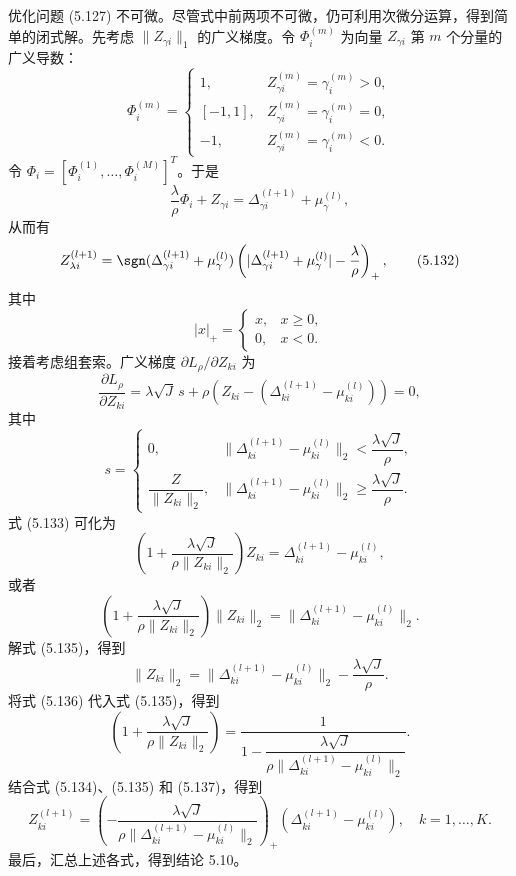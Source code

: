 优化问题 (5.127) 不可微。尽管式中前两项不可微，仍可利用次微分运算，得到简单的闭式解。先考虑 $\lVert Z_{\gamma i}\rVert_1$ 的广义梯度。令 $\Phi_i^{(m)}$ 为向量 $Z_{\gamma i}$ 第 $m$ 个分量的广义导数：
\[
\Phi_i^{(m)}=\begin{cases}
1,&Z_{\gamma i}^{(m)}=\gamma_i^{(m)}>0,\\
[-1,1],&Z_{\gamma i}^{(m)}=\gamma_i^{(m)}=0,\\
-1,&Z_{\gamma i}^{(m)}=\gamma_i^{(m)}<0.
\end{cases}
\]
令 $\Phi_i=[\Phi_i^{(1)},\ldots,\Phi_i^{(M)}]^T$。于是
\[
\frac\lambda\rho\Phi_i+Z_{\gamma i}=\Delta_{\gamma i}^{(l+1)}+\mu_\gamma^{(l)},
\]
从而有
\begin{equation}
Z_{\lambda i}^{(l+1)}=\sgn(\Delta_{\gamma i}^{(l+1)}+\mu_\gamma^{(l)})
\left(|\Delta_{\gamma i}^{(l+1)}+\mu_\gamma^{(l)}|-\frac\lambda\rho\right)_+,
\tag{5.132}
\end{equation}
其中
\[
|x|_+=\begin{cases}x,&x\geq0,\\0,&x<0.\end{cases}
\]
接着考虑组套索。广义梯度 $\partial L_\rho/\partial Z_{ki}$ 为
\begin{equation}
\frac{\partial L_\rho}{\partial Z_{ki}}
=\lambda\sqrt J\,s+\rho\left(Z_{ki}-(\Delta_{ki}^{(l+1)}-\mu_{ki}^{(l)})\right)=0,
\tag{5.133}
\end{equation}
其中
\[
s=\begin{cases}
0,&\lVert\Delta_{ki}^{(l+1)}-\mu_{ki}^{(l)}\rVert_2<\dfrac{\lambda\sqrt J}\rho,\\[4pt]
\dfrac{Z}{\lVert Z_{ki}\rVert_2},&\lVert\Delta_{ki}^{(l+1)}-\mu_{ki}^{(l)}\rVert_2\geq\dfrac{\lambda\sqrt J}\rho.
\end{cases}
\]
式 (5.133) 可化为
\begin{equation}
\left(1+\frac{\lambda\sqrt J}{\rho\lVert Z_{ki}\rVert_2}\right)Z_{ki}
=\Delta_{ki}^{(l+1)}-\mu_{ki}^{(l)},
\tag{5.134}
\end{equation}
或者
\begin{equation}
\left(1+\frac{\lambda\sqrt J}{\rho\lVert Z_{ki}\rVert_2}\right)\lVert Z_{ki}\rVert_2
=\lVert\Delta_{ki}^{(l+1)}-\mu_{ki}^{(l)}\rVert_2.
\tag{5.135}
\end{equation}
解式 (5.135)，得到
\begin{equation}
\lVert Z_{ki}\rVert_2=\lVert\Delta_{ki}^{(l+1)}-\mu_{ki}^{(l)}\rVert_2
-\frac{\lambda\sqrt J}\rho.
\tag{5.136}
\end{equation}
将式 (5.136) 代入式 (5.135)，得到
\begin{equation}
\left(1+\frac{\lambda\sqrt J}{\rho\lVert Z_{ki}\rVert_2}\right)
=\frac{1}{1-\dfrac{\lambda\sqrt J}{\rho\lVert\Delta_{ki}^{(l+1)}-\mu_{ki}^{(l)}\rVert_2}}.
\tag{5.137}
\end{equation}
结合式 (5.134)、(5.135) 和 (5.137)，得到
\begin{equation}
Z_{ki}^{(l+1)}=\left(-\frac{\lambda\sqrt J}{\rho\lVert\Delta_{ki}^{(l+1)}-\mu_{ki}^{(l)}\rVert_2}\right)_+
(\Delta_{ki}^{(l+1)}-\mu_{ki}^{(l)}),\quad k=1,\ldots,K.
\tag{5.138}
\end{equation}
最后，汇总上述各式，得到结论 5.10。

